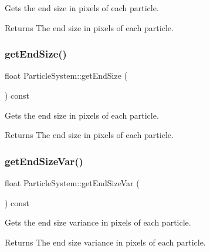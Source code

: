 Gets the end size in pixels of each particle.

\begin{DoxyReturn}{Returns}
The end size in pixels of each particle. 
\end{DoxyReturn}
\mbox{\label{classParticleSystem_a8366ad864f3b29ad8fd0f436934cad9e}} 
\subsubsection{\texorpdfstring{get\+End\+Size()}{getEndSize()}\hspace{0.1cm}{\footnotesize\ttfamily [2/2]}}
{\footnotesize\ttfamily float Particle\+System\+::get\+End\+Size (\begin{DoxyParamCaption}{ }\end{DoxyParamCaption}) const\hspace{0.3cm}{\ttfamily [inline]}}

Gets the end size in pixels of each particle.

\begin{DoxyReturn}{Returns}
The end size in pixels of each particle. 
\end{DoxyReturn}
\mbox{\label{classParticleSystem_a04a3e0ed99bafaeea93fc41f92c82257}} 
\subsubsection{\texorpdfstring{get\+End\+Size\+Var()}{getEndSizeVar()}\hspace{0.1cm}{\footnotesize\ttfamily [1/2]}}
{\footnotesize\ttfamily float Particle\+System\+::get\+End\+Size\+Var (\begin{DoxyParamCaption}{ }\end{DoxyParamCaption}) const\hspace{0.3cm}{\ttfamily [inline]}}

Gets the end size variance in pixels of each particle.

\begin{DoxyReturn}{Returns}
The end size variance in pixels of each particle. 
\end{DoxyReturn}
\mbox{\label{classParticleSystem_a04a3e0ed99bafaeea93fc41f92c82257}} 
